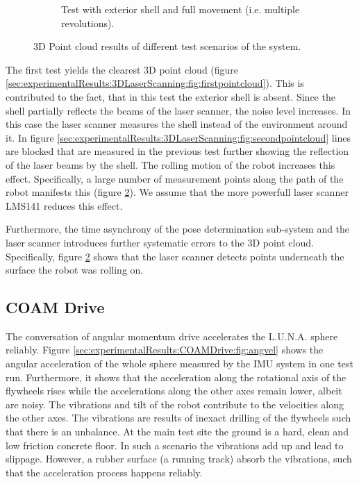 \begin{figure}
\begin{subfigure}[b]{\textwidth}
	\caption{Test with exterior shell and full movement (i.e. multiple revolutions).}
	\label{sec:experimentalResults:3DLaserScanning:fig:thirdpointcloud}
\end{subfigure}
\caption{3D Point cloud results of different test scenarios of the system.}
\end{figure}

The first test yields the clearest 3D point cloud (figure \ref{sec:experimentalResults:3DLaserScanning:fig:firstpointcloud}).
This is contributed to the fact, that in this test the exterior shell is absent.
Since the shell partially reflects the beams of the laser scanner, the noise level increases.
In this case the laser scanner measures the shell instead of the environment around it.
In figure \ref{sec:experimentalResults:3DLaserScanning:fig:secondpointcloud} lines are blocked that are measured in the previous test further showing the reflection of the laser beams by the shell.
The rolling motion of the robot increases this effect.
Specifically, a large number of measurement points along the path of the robot manifests this (figure \ref{sec:experimentalResults:3DLaserScanning:fig:thirdpointcloud}).
We assume that the more powerfull laser scanner LMS141 reduces this effect. 

Furthermore, the time asynchrony of the pose determination sub-system and the laser scanner introduces further systematic errors to the 3D point cloud.
Specifically, figure \ref{sec:experimentalResults:3DLaserScanning:fig:thirdpointcloud} shows that the laser scanner detects points underneath the surface the robot was rolling on. 

\subsection{COAM Drive}
\label{sec:experimentalResults:COAMDrive}

The conversation of angular momentum drive accelerates the L.U.N.A. sphere reliably.
Figure \ref{sec:experimentalResults:COAMDrive:fig:angvel} shows the angular acceleration of the whole sphere measured by the IMU system in one test run. Furthermore, it shows that the acceleration along the rotational axis of the flywheels rises while the accelerations along the other axes remain lower, albeit are noisy.
The vibrations and tilt of the robot contribute to the velocities along the other axes.
The vibrations are results of inexact drilling of the flywheels such that there is an unbalance.
At the main test site the ground is a hard, clean and low friction concrete floor.
In such a scenario the vibrations add up and lead to slippage.
However, a rubber surface (a running track) absorb the vibrations, such that the acceleration process happens reliably.

